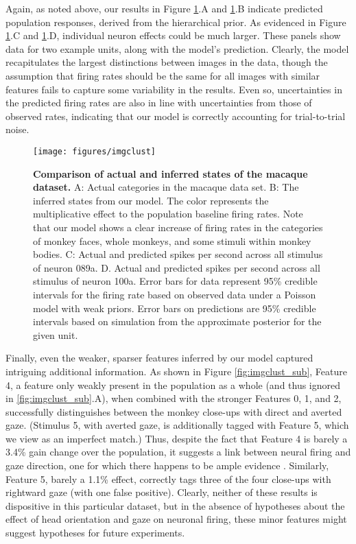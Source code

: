 \documentclass{nature}
\begin{document}
Again, as noted above, our results in Figure \ref{fig:imgclust}.A and \ref{fig:imgclust}.B indicate predicted population responses, derived from the hierarchical prior. As evidenced in Figure \ref{fig:imgclust}.C and \ref{fig:imgclust}.D, individual neuron effects could be much larger. These panels show data for two example units, along with the model's prediction. Clearly, the model recapitulates the largest distinctions between images in the data, though the assumption that firing rates should be the same for all images with similar features fails to capture some variability in the results. Even so, uncertainties in the predicted firing rates are also in line with uncertainties from those of observed rates, indicating that our model is correctly accounting for trial-to-trial noise.

\begin{figure}
    \texttt{[image: figures/imgclust]}
	\caption{\textbf{Comparison of actual and inferred states of the macaque dataset.}
	\linespread{1.2} \small A: Actual categories in the macaque data set. B: The inferred states from our model. The color represents the multiplicative effect to the population baseline firing rates. Note that our model shows a clear increase of firing rates in the categories of monkey faces, whole monkeys, and some stimuli within monkey bodies. C: Actual and predicted spikes per second across all stimulus of neuron 089a. D. Actual and predicted spikes per second across all stimulus of neuron 100a. Error bars for data represent 95\% credible intervals for the firing rate based on observed data under a Poisson model with weak priors. Error bars on predictions are 95\% credible intervals based on simulation from the approximate posterior for the given unit.
    }
	\label{fig:imgclust}
\end{figure}

Finally, even the weaker, sparser features inferred by our model captured intriguing additional information. As shown in Figure \ref{fig:imgclust_sub}, Feature 4, a feature only weakly present in the population as a whole (and thus ignored in \ref{fig:imgclust_sub}.A), when combined with the stronger Features 0, 1, and 2, successfully distinguishes between the monkey close-ups with direct and averted gaze. (Stimulus 5, with averted gaze, is additionally tagged with Feature 5, which we view as an imperfect match.) Thus, despite the fact that Feature 4 is barely a 3.4\% gain change over the population, it suggests a link between neural firing and gaze direction, one for which there happens to be ample evidence \cite{Perrett23, Freiwald845}. Similarly, Feature 5, barely a 1.1\% effect, correctly tags three of the four close-ups with rightward gaze (with one false positive). Clearly, neither of these results is dispositive in this particular dataset, but in the absence of hypotheses about the effect of head orientation and gaze on neuronal firing, these minor features might suggest hypotheses for future experiments.
\end{document}
